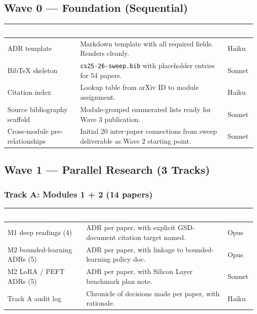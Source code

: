 \documentclass[11pt,letterpaper]{article}
\newcommand{\tableheader}[1]{\textbf{\sffamily\textcolor{white}{#1}}}
\begin{document}
\subsection{Wave 0 --- Foundation (Sequential)}

\begin{center}
\begin{tabularx}{\textwidth}{L{3cm}XC{1.5cm}}
\toprule
{}
\tableheader{Component} & \tableheader{Acceptance} & \tableheader{Model} \\
\midrule
ADR template & Markdown template with all required fields. Renders cleanly. & Haiku \\
BibTeX skeleton & \texttt{cs25-26-sweep.bib} with placeholder entries for 54 papers. & Sonnet \\
Citation index & Lookup table from arXiv ID to module assignment. & Haiku \\
Source bibliography scaffold & Module-grouped enumerated lists ready for Wave 3 publication. & Sonnet \\
Cross-module pre-relationships & Initial 20 inter-paper connections from sweep deliverable as Wave 2 starting point. & Sonnet \\
\bottomrule
\end{tabularx}
\end{center}

\subsection{Wave 1 --- Parallel Research (3 Tracks)}

\subsubsection{Track A: Modules 1 + 2 (14 papers)}

\begin{center}
\begin{tabularx}{\textwidth}{L{3.5cm}XC{1.5cm}}
\toprule
{}
\tableheader{Component} & \tableheader{Acceptance} & \tableheader{Model} \\
\midrule
M1 deep readings (4) & ADR per paper, with explicit GSD-document citation target named. & Opus \\
M2 bounded-learning ADRs (5) & ADR per paper, with linkage to bounded-learning policy doc. & Opus \\
M2 LoRA / PEFT ADRs (5) & ADR per paper, with Silicon Layer benchmark plan note. & Sonnet \\
Track A audit log & Chronicle of decisions made per paper, with rationale. & Haiku \\
\bottomrule
\end{tabularx}
\end{center}
\end{document}
